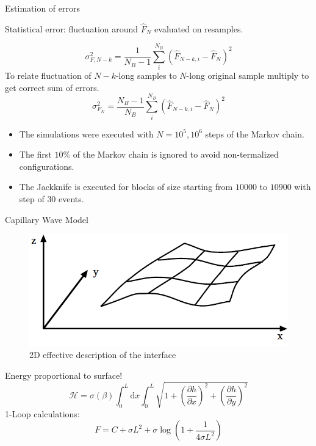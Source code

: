 \documentclass[12pt,handout]{beamer}
\begin{document}
\begin{frame}{Estimation of errors}
\begin{center}
Statistical error: fluctuation around $\hat{F}_N$ evaluated on resamples.

\[
	\sigma_{F, N-k}^2 = \frac{1}{N_B-1}\sum_i ^{N_B} \left(\hat{F}_{N-k, i} - \hat{F}_N\right)^2
\]
To relate fluctuation of $N-k$-long samples to $N$-long original sample multiply to get correct sum of errors.
\[
	\sigma_{F_N}^2 = \frac{N_B-1}{N_B}\sum_i ^{N_B} \left(\hat{F}_{N-k, i} - \hat{F}_N\right)^2
\]
\end{center}
\end{frame}

\begin{frame}
\begin{center}
\begin{itemize}
\item The simulations were executed with $N = 10^5, 10^6$ steps of the Markov chain.\\
\vspace{10pt}
\item The first $10\%$ of the Markov chain is ignored to avoid non-termalized configurations.\\
\vspace{10pt}
\item The Jackknife is executed for blocks of size starting from $10000$ to $10900$ with step of $30$ events. 
\end{itemize}
\end{center}
\end{frame}

\begin{frame}{Capillary Wave Model}

\begin{figure}[!htb]
\centering
\includegraphics[scale=0.5]{CWM.png}
\caption{2D effective description of the interface}
\end{figure}
\begin{center}
Energy proportional to surface!
\[
	\mathcal H = \sigma\left(\beta \right) \int _0 ^{L} \mbox{d}x \int _0 ^{L} \sqrt{1 + \left(\frac{\partial h}{\partial x}\right)^2 + \left(\frac{\partial h}{\partial y}\right)^2}
\]
1-Loop calculations:
\[
	F = C + \sigma L ^2 + \sigma\log\left( 1 + \frac{1}{4\sigma L^2}\right)
\]
\end{center}
\end{frame}
\end{document}
